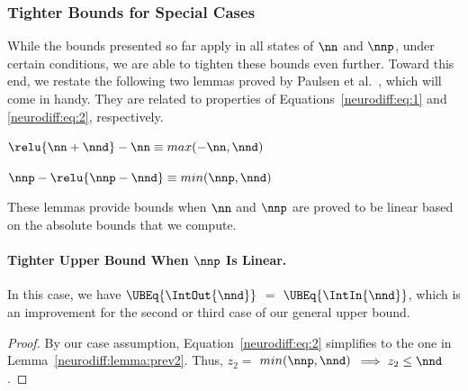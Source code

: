 \subsubsection{Tighter Bounds for Special Cases}
\label{neurodiff:sec:tighter}

While the bounds presented so far apply in all states of $ \nn $ and
$ \nnp $, under certain conditions, we are able to tighten these
bounds even further.
%
Toward this end, we restate the following two lemmas proved by Paulsen
et al.~\cite{PaulsenWW20}, which will come in handy.  They are related
to properties of Equations~\ref{neurodiff:eq:1} and \ref{neurodiff:eq:2},
respectively.
%
\begin{lemma} \label{neurodiff:lemma:prev1}
	$ \relu{{\nn} + {\nnd}} - \nn \equiv max(-\nn, \nnd)$
\end{lemma}
\begin{lemma} \label{neurodiff:lemma:prev2}
	$ \nnp - \relu{{\nnp} - {\nnd}} \equiv min(\nnp, \nnd)$
\end{lemma}
%
These lemmas provide bounds when $ \nn $ and $ \nnp $ are proved to be
linear based on the absolute bounds that we compute.

\paragraph{Tighter Upper Bound When $ \nnp $ Is Linear.}

In this case, we have $ \UBEq{\IntOut{\nnd}} $ $ = $
$ \UBEq{\IntIn{\nnd}}$, which is an improvement for the second or
third case of our general upper bound.

\begin{proof}
By our case assumption, Equation~\ref{neurodiff:eq:2} simplifies to the one in
Lemma~\ref{neurodiff:lemma:prev2}. Thus, $ z_2 =$ $ min(\nnp, \nnd) $ $\implies
z_2 \leq \nnd $.
\end{proof}

